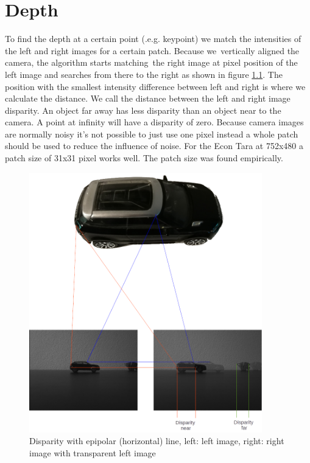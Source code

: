 \documentclass[11pt,a4paper,titlepage,oneside]{report}
\begin{document}
\chapter{Depth}\label{ch:depth}

To find the depth at a certain point (.e.g. keypoint) we match the intensities of the left and right images for a certain patch. Because we vertically aligned the camera, the algorithm starts matching the right image at pixel position of the left image and searches from there to the right as shown in figure \ref{fig:disparity}. The position with the smallest intensity difference between left and right is where we calculate the distance. We call the distance between the left and right image disparity. An object far away has less disparity than an object near to the camera. A point at infinity will have a disparity of zero. Because camera images are normally noisy it's not possible to just use one pixel instead a whole patch should be used to reduce the influence of noise. For the Econ Tara at 752x480 a patch size of 31x31 pixel works well. The patch size was found empirically.

\begin{figure}[H]
  \begin{center}
    \includegraphics[width=0.9\textwidth]{img/disparity_concept.png}
  \end{center}
  \caption{Disparity with epipolar (horizontal) line, left: left image, right: right image with transparent left image}\label{fig:disparity}
\end{figure}
\end{document}
